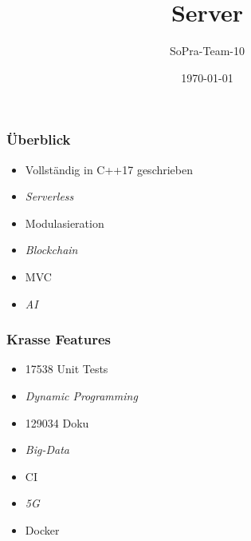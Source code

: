 \documentclass[aspectratio=169]{beamer}
\title{Server}
\author{SoPra-Team-10}
\date{\today}
\begin{document}
\maketitle

\begin{frame}
    \frametitle{Überblick}
    \begin{itemize}
        \item Vollständig in C++17 geschrieben
            \pause
        \item \textit{Serverless}
            \pause
        \item Modulasieration
            \pause
        \item \textit{Blockchain}
            \pause
        \item MVC
            \pause
        \item \textit{AI}
    \end{itemize}
\end{frame}

\begin{frame}
    \frametitle{Krasse Features}
    \begin{itemize}
        \item 17538 Unit Tests
            \pause
        \item \textit{Dynamic Programming}
            \pause
        \item 129034 Doku
            \pause
        \item \textit{Big-Data}
            \pause
        \item CI
            \pause
        \item \textit{5G}
            \pause
        \item Docker
    \end{itemize}
\end{frame}
\end{document}
